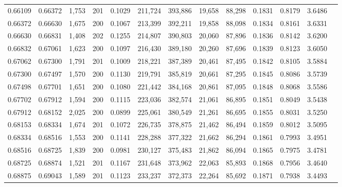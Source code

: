 \begin{tabular}{rrrrrrrrrrrrr}
0.66109 & 0.66372 & 1,753 & 201 &                                     0.1029 & 211,724 & 393,886 &  19,658 &  88,298 & 0.1831 & 0.8179 & 3.6486 \\
0.66372 & 0.66630 & 1,675 & 200 &                                     0.1067 & 213,399 & 392,211 &  19,858 &  88,098 & 0.1834 & 0.8161 & 3.6331 \\
0.66630 & 0.66831 & 1,408 & 202 &                                     0.1255 & 214,807 & 390,803 &  20,060 &  87,896 & 0.1836 & 0.8142 & 3.6200 \\
0.66832 & 0.67061 & 1,623 & 200 &                                     0.1097 & 216,430 & 389,180 &  20,260 &  87,696 & 0.1839 & 0.8123 & 3.6050 \\
0.67062 & 0.67300 & 1,791 & 201 &                                     0.1009 & 218,221 & 387,389 &  20,461 &  87,495 & 0.1842 & 0.8105 & 3.5884 \\
0.67300 & 0.67497 & 1,570 & 200 &                                     0.1130 & 219,791 & 385,819 &  20,661 &  87,295 & 0.1845 & 0.8086 & 3.5739 \\
0.67498 & 0.67701 & 1,651 & 200 &                                     0.1080 & 221,442 & 384,168 &  20,861 &  87,095 & 0.1848 & 0.8068 & 3.5586 \\
0.67702 & 0.67912 & 1,594 & 200 &                                     0.1115 & 223,036 & 382,574 &  21,061 &  86,895 & 0.1851 & 0.8049 & 3.5438 \\
0.67912 & 0.68152 & 2,025 & 200 &                                     0.0899 & 225,061 & 380,549 &  21,261 &  86,695 & 0.1855 & 0.8031 & 3.5250 \\
0.68153 & 0.68334 & 1,674 & 201 &                                     0.1072 & 226,735 & 378,875 &  21,462 &  86,494 & 0.1859 & 0.8012 & 3.5095 \\
0.68334 & 0.68516 & 1,553 & 200 &                                     0.1141 & 228,288 & 377,322 &  21,662 &  86,294 & 0.1861 & 0.7993 & 3.4951 \\
0.68516 & 0.68725 & 1,839 & 200 &                                     0.0981 & 230,127 & 375,483 &  21,862 &  86,094 & 0.1865 & 0.7975 & 3.4781 \\
0.68725 & 0.68874 & 1,521 & 201 &                                     0.1167 & 231,648 & 373,962 &  22,063 &  85,893 & 0.1868 & 0.7956 & 3.4640 \\
0.68875 & 0.69043 & 1,589 & 201 &                                     0.1123 & 233,237 & 372,373 &  22,264 &  85,692 & 0.1871 & 0.7938 & 3.4493 \\

\end{tabular}
